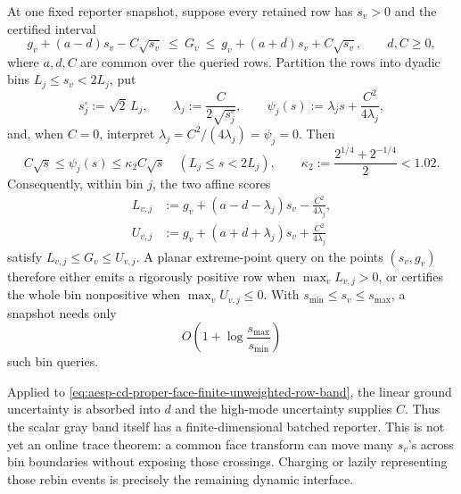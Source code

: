 \begin{corollary}
\label{cor:aesp-cd-proper-face-dyadic-gray-reporter}
At one fixed reporter snapshot, suppose every retained row has
\(s_v>0\) and the certified interval
\begin{equation}
 g_v+(a-d)s_v-C\sqrt{s_v}
 \ \leq\ G_v\ \leq\
 g_v+(a+d)s_v+C\sqrt{s_v},
 \qquad d,C\geq0,
 \label{eq:aesp-cd-proper-face-affine-root-band}
\end{equation}
where \(a,d,C\) are common over the queried rows.  Partition the rows into
dyadic bins \(L_j\leq s_v<2L_j\), put
\begin{equation*}
 s_j^\circ:=\sqrt2\,L_j,
 \qquad
 \lambda_j:=\frac{C}{2\sqrt{s_j^\circ}},
 \qquad
 \psi_j(s):=\lambda_js+\frac{C^2}{4\lambda_j},
\end{equation*}
and, when \(C=0\), interpret
\(\lambda_j=C^2/(4\lambda_j)=\psi_j=0\).  Then
\begin{equation}
 C\sqrt{s}\leq\psi_j(s)
 \leq\kappa_2 C\sqrt{s}
 \quad(L_j\leq s<2L_j),
 \qquad
 \kappa_2:=\frac{2^{1/4}+2^{-1/4}}2<1.02.
 \label{eq:aesp-cd-proper-face-dyadic-root-majorant}
\end{equation}
Consequently, within bin \(j\), the two affine scores
\begin{align*}
 L_{v,j}
 &:=g_v+(a-d-\lambda_j)s_v-\frac{C^2}{4\lambda_j},\\
 U_{v,j}
 &:=g_v+(a+d+\lambda_j)s_v+\frac{C^2}{4\lambda_j}
\end{align*}
satisfy \(L_{v,j}\leq G_v\leq U_{v,j}\).  A planar extreme-point query on
the points \((s_v,g_v)\) therefore either emits a rigorously positive row
when \(\max_vL_{v,j}>0\), or certifies the whole bin nonpositive when
\(\max_vU_{v,j}\leq0\).  With
\(s_{\min}\leq s_v\leq s_{\max}\), a snapshot needs only
\begin{equation*}
 O\!\left(1+\log\frac{s_{\max}}{s_{\min}}\right)
\end{equation*}
such bin queries.

Applied to
\cref{eq:aesp-cd-proper-face-finite-unweighted-row-band}, the linear ground
uncertainty is absorbed into \(d\) and the high-mode uncertainty supplies
\(C\).  Thus the scalar gray band itself has a finite-dimensional batched
reporter.  This is not yet an online trace theorem: a common face transform
can move many \(s_v\)'s across bin boundaries without exposing those
crossings.  Charging or lazily representing those rebin events is precisely
the remaining dynamic interface.
\end{corollary}

